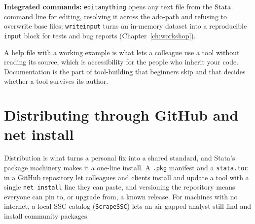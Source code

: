\documentclass[
    a4paper,
    fontsize=10pt,
    twoside=true,
    numbers=noenddot,
]{kaobook}
\begin{document}
\begin{kaobox}[frametitle=Package Integration: \texttt{editanything} and \texttt{writeinput}]
\textbf{Integrated commands:} \texttt{editanything} opens any text file from the Stata command line for editing, resolving it across the ado-path and refusing to overwrite base files; \texttt{writeinput} turns an in-memory dataset into a reproducible \texttt{input} block for tests and bug reports (Chapter~\ref{ch:workshop}).
\end{kaobox}

A help file with a working example is what lets a colleague use a tool without reading its source, which is accessibility for the people who inherit your code. Documentation is the part of tool-building that beginners skip and that decides whether a tool survives its author.

\section{Distributing through GitHub and net install}
Distribution is what turns a personal fix into a shared standard, and Stata's package machinery makes it a one-line install. A \texttt{.pkg} manifest and a \texttt{stata.toc} in a GitHub repository let colleagues and clients install and update a tool with a single \texttt{net install} line they can paste, and versioning the repository means everyone can pin to, or upgrade from, a known release. For machines with no internet, a local SSC catalog (\texttt{ScrapeSSC}) lets an air-gapped analyst still find and install community packages.
\end{document}
